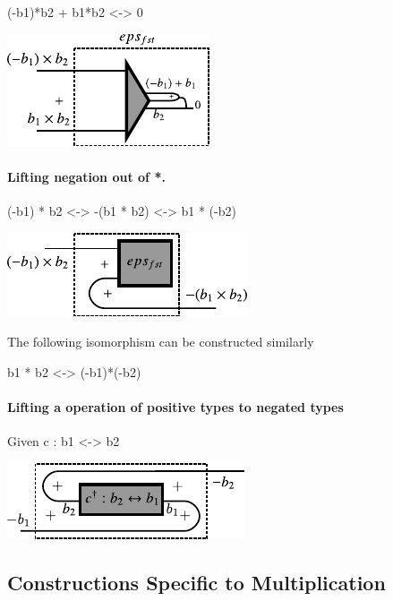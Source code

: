 \documentclass[preprint]{sigplanconf}
\begin{document}
{{(-b1)*b2 + b1*b2 <-> 0}}

\begin{center}
  \includegraphics{diagrams/eps_fst.pdf}
\end{center}

\paragraph*{Lifting negation out of {{*}}. }

{{(-b1) * b2 <-> -(b1 * b2) <-> b1 * (-b2)}}

\begin{center}
  \includegraphics{diagrams/mult_neg.pdf}
\end{center}

The following isomorphism can be constructed similarly 

{{b1 * b2 <-> (-b1)*(-b2)}}


\paragraph*{Lifting a operation of positive types to negated types}

Given {{c : b1 <-> b2}}

\begin{center}
  \includegraphics{diagrams/neg_lift.pdf}
\end{center}


\subsection{Constructions Specific to Multiplication}
\end{document}
